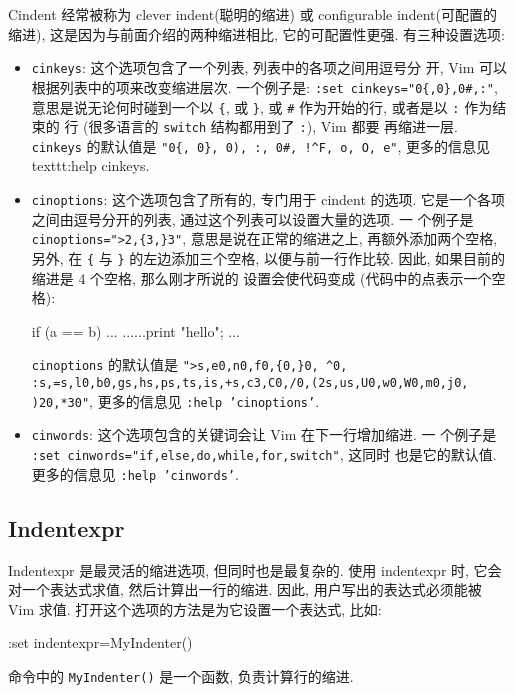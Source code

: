 Cindent 经常被称为 clever indent(聪明的缩进) 或 configurable indent(可配置的
缩进), 这是因为与前面介绍的两种缩进相比, 它的可配置性更强. 有三种设置选项:
\begin{itemize}
    \item \texttt{cinkeys}: 这个选项包含了一个列表, 列表中的各项之间用逗号分
        开, Vim 可以根据列表中的项来改变缩进层次. 一个例子是: \texttt{:set
            cinkeys="0\{,0\},0\#,:"}, 意思是说无论何时碰到一个以 \verb'{', 或
            \verb'}', 或 \verb'#' 作为开始的行, 或者是以 \verb':' 作为结束的
            行 (很多语言的 \texttt{switch} 结构都用到了 \verb':'), Vim 都要
            再缩进一层. \texttt{cinkeys} 的默认值是 \texttt{"0\{, 0\}, 0), :,
        0\#, !\textasciicircum F, o, O, e"}, 更多的信息见 
        texttt{:help cinkeys}.
    \item \texttt{cinoptions}: 这个选项包含了所有的, 专门用于 cindent 的选项.
        它是一个各项之间由逗号分开的列表, 通过这个列表可以设置大量的选项. 一
        个例子是 \texttt{cinoptions=">2,\{3,\}3"}, 意思是说在正常的缩进之上,
        再额外添加两个空格, 另外, 在 \verb'{' 与 \verb'}' 的左边添加三个空格,
        以便与前一行作比较. 因此, 如果目前的缩进是 4 个空格, 那么刚才所说的
        设置会使代码变成 (代码中的点表示一个空格):
        \begin{vimcode}
    if (a == b)
    ...{
    ......print "hello";
    ...}
        \end{vimcode}
        \texttt{cinoptions} 的默认值是 \texttt{">s,e0,n0,f0,\{0,\}0,%
        \textasciicircum 0,%
        :s,=s,l0,b0,gs,hs,ps,ts,is,+s,c3,C0,/0,(2s,us,U0,w0,W0,m0,j0,%
        )20,*30"}, 更多的信息见 \texttt{:help 'cinoptions'}.
    \item \texttt{cinwords}: 这个选项包含的关键词会让 Vim 在下一行增加缩进. 一
        个例子是 \texttt{:set cinwords="if,else,do,while,for,switch"}, 这同时
        也是它的默认值. 更多的信息见 \texttt{:help 'cinwords'}.
\end{itemize}

\subsection{Indentexpr}
\label{subsec:indentexpr}

Indentexpr 是最灵活的缩进选项, 但同时也是最复杂的. 使用 indentexpr 时, 它会
对一个表达式求值, 然后计算出一行的缩进. 因此, 用户写出的表达式必须能被 Vim
求值. 打开这个选项的方法是为它设置一个表达式, 比如:
\begin{vimcode}
:set indentexpr=MyIndenter()
\end{vimcode}
命令中的 \texttt{MyIndenter()} 是一个函数, 负责计算行的缩进.

